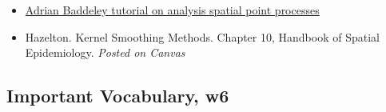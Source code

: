 \documentclass[
]{book}
\providecommand{\tightlist}{%
  \setlength{\itemsep}{0pt}\setlength{\parskip}{0pt}}
\begin{document}
\begin{itemize}
\tightlist
\item
  \href{https://training.fws.gov/courses/references/tutorials/geospatial/CSP7304/documents/PointPatterTutorial.pdf}{Adrian Baddeley tutorial on analysis spatial point processes}
\item
  Hazelton. Kernel Smoothing Methods. Chapter 10, Handbook of Spatial Epidemiology. \emph{Posted on Canvas}
\end{itemize}

\hypertarget{important-vocabulary-w6}{%
\subsection{Important Vocabulary, w6}\label{important-vocabulary-w6}}

 
  \providecommand{\huxb}[2]{\arrayrulecolor[RGB]{#1}\global\arrayrulewidth=#2pt}
  \providecommand{\huxvb}[2]{\color[RGB]{#1}\vrule width #2pt}
  \providecommand{\huxtpad}[1]{\rule{0pt}{#1}}
  \providecommand{\huxbpad}[1]{\rule[-#1]{0pt}{#1}}
\end{document}
